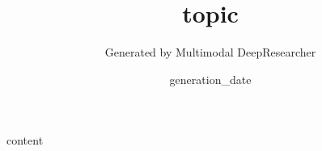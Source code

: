 \documentclass[a4paper,11pt]{article}
\begin{document}
\title{\textbf{ {{ topic }} }}
\author{Generated by Multimodal DeepResearcher}
\date{ {{ generation_date }} }
\maketitle

\tableofcontents
\newpage

{{ content }}
\end{document}
